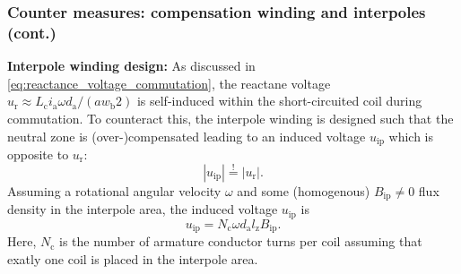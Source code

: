 \begin{frame}
	\frametitle{Counter measures: compensation winding and interpoles (cont.)}
   \textbf{Interpole winding design:}
   As discussed in \eqref{eq:reactance_voltage_commutation}, the reactane voltage $u_\mathrm{r} \approx  L_\mathrm{c} i_\mathrm{a} \omega d_\mathrm{a} / (a w_\mathrm{b}2)$ is self-induced within the short-circuited coil during commutation. To counteract this, the interpole winding is designed such that the neutral zone is (over-)compensated leading to an induced voltage $u_\mathrm{ip}$ which is opposite to $u_\mathrm{r}$:
   \begin{equation}
	   |u_\mathrm{ip}| \stackrel{!}{=} |u_\mathrm{r}|.
	   \label{eq:Interpole_voltage_condition}
	\end{equation} \pause
	Assuming a rotational angular velocity $\omega$ and some (homogenous) $B_\mathrm{ip}\neq 0$ flux density in the interpole area, the induced voltage $u_\mathrm{ip}$ is
	\begin{equation}
		u_\mathrm{ip} =  N_\mathrm{c} \omega d_\mathrm{a} l_\mathrm{z} B_\mathrm{ip}.
		\label{eq:Induced_voltage_interpole}
	 \end{equation} 
	 Here, $N_\mathrm{c}$ is the number of armature conductor turns per coil assuming that exatly one coil is placed in the interpole area. 
\end{frame}

